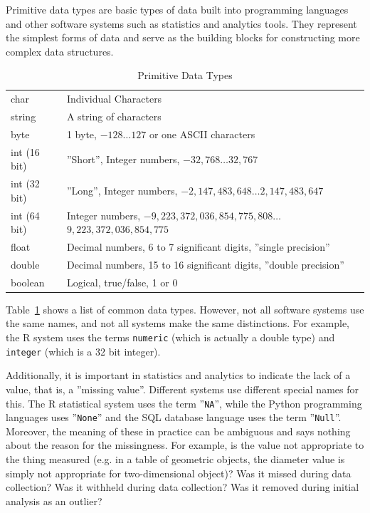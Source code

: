 Primitive data types are basic types of data built into programming languages and other software systems such as statistics and analytics tools. They represent the simplest forms of data and serve as the building blocks for constructing more complex data structures.

\begin{table}
\renewcommand{\arraystretch}{1.25}

\begin{tabularx}{\textwidth}{l|X} \hline
char 			& Individual Characters\\
string			& A string of characters\\
byte			& 1 byte, $-128 \ldots 127$ or one ASCII characters \\
int (16 bit)	& ''Short'', Integer numbers, $-32,768 \ldots 32,767$ \\ 
int (32 bit)	& ''Long'', Integer numbers, $-2,147,483,648 \ldots 2,147,483,647$ \\
int (64 bit)	& Integer numbers, $-9,223,372,036,854,775,808 \ldots$ $9,223,372,036,854,775$ \\
float			& Decimal numbers, 6 to 7 significant digits, ''single precision'' \\
double			& Decimal numbers, 15 to 16 significant digits, ''double precision'' \\
boolean			& Logical, true/false, 1 or 0 \\ \hline
\end{tabularx} 
\caption{Primitive Data Types}
\label{tab:primitive}
\end{table}

Table~\ref{tab:primitive} shows a list of common data types. However, not all software systems use the same names, and not all systems make the same distinctions. For example, the R system uses the terms \texttt{numeric} (which is actually a double type) and \texttt{integer} (which is a 32 bit integer).

Additionally, it is important in statistics and analytics to indicate the lack of a value, that is, a ''missing value''. Different systems use different special names for this. The R statistical system uses the term ''\texttt{NA}'', while the Python programming languages uses ''\texttt{None}'' and the SQL database language uses the term ''\texttt{Null}''. Moreover, the meaning of these in practice can be ambiguous and says nothing about the reason for the missingness. For example, is the value not appropriate to the thing measured (e.g. in a table of geometric objects, the diameter value is simply not appropriate for two-dimensional object)? Was it missed during data collection? Was it withheld during data collection? Was it removed during initial analysis as an outlier?

